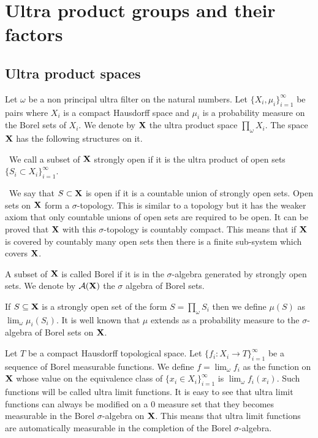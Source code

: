 \documentclass [11pt] {article}
\def\bX{{\bf X}}
\begin{document}
\section{Ultra product groups and their factors}

\subsection{Ultra product spaces}

Let $\omega$ be a non principal ultra filter on the natural numbers. 
Let $\{X_i,\mu_i\}_{i=1}^\infty$ be pairs where $X_i$ is a compact Hausdorff space and $\mu_i$ is a probability measure on the Borel sets of $X_i$.
We denote by $\bX$ the ultra product space $\prod_{\omega}X_i$.
The space $\bX$ has the following structures on it.

\medskip

 ~We call a subset of $\bX$ strongly open if it is the ultra product of open sets $\{S_i\subset X_i\}_{i=1}^\infty$.

\medskip

~We say that $S\subset \bX$ is open if it is a countable union of strongly open sets. Open sets on $\bX$ form a $\sigma$-topology. This is similar to a topology but it has the weaker axiom that only countable unions of open sets are required to be open. It can be proved that $\bX$ with this $\sigma$-topology is countably compact. This means that if $\bX$ is covered by countably many open sets then there is a finite sub-system which covers $\bX$.

\medskip

 A subset of $\bX$ is called Borel if it is in the $\sigma$-algebra generated by strongly open sets. We denote by $\mathcal{A}(\bX)$ the $\sigma$ algebra of Borel sets.

\medskip

  If $S\subseteq \bX$ is a strongly open set of the form $S=\prod_\omega S_i$ then we define $\mu(S)$ as $\lim_\omega\mu_i(S_i)$. It is well known that $\mu$ extends as a probability measure to the $\sigma$-algebra of Borel sets on $\bX$. 

\medskip

 Let $T$ be a compact Hausdorff topological space. Let $\{f_i:X_i\rightarrow T\}_{i=1}^\infty$ be a sequence of Borel measurable functions. We define $f=\lim_\omega f_i$ as the function on $\bX$ whose value on the equivalence class of $\{x_i\in X_i\}_{i=1}^\infty$ is $\lim_\omega f_i(x_i)$. Such functions will be called ultra limit functions. It is easy to see that ultra limit functions can always be modified on a $0$ measure set that they becomes measurable in the Borel $\sigma$-algebra on $\bX$. This means that ultra limit functions are automatically measurable in the completion of the Borel $\sigma$-algebra.
\end{document}
